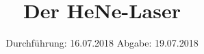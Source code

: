 
\usepackage{nicefrac}

\subject{V61}
\title{Der HeNe-Laser}
\date{
\centering
  Durchführung: 16.07.2018
  \hspace{3em}
  Abgabe: 19.07.2018
}



\maketitle
\thispagestyle{empty}
\tableofcontents
\newpage

%

%




\printbibliography


